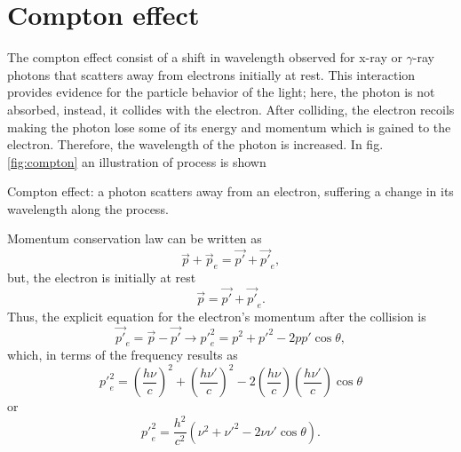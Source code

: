 \documentclass{article}
\begin{document}
\section{Compton effect}
The compton effect consist of a shift in wavelength observed for x-ray or $\gamma$-ray photons that scatters away from electrons initially at rest. This interaction provides evidence for the particle behavior of the light; here, the photon is not absorbed, instead, it collides with the electron. After colliding, the electron recoils making the photon lose some of its energy and momentum which is gained to the electron. Therefore, the wavelength of the photon is increased. In fig. \ref{fig:compton} an illustration of process is shown
\begin{marginfigure}%
  \caption{Compton effect: a photon scatters away from an electron, suffering a change in its wavelength along the process.}
  \label{fig:compton}
\end{marginfigure}
Momentum conservation law can be written as
\begin{equation}\label{eq:momentumconserv}
  \vec{p}+\vec{p}_e=\vec{p'}+\vec{p'}_e,
\end{equation}
but, the electron is initially at rest
\begin{equation}\label{eq:momentumconserv1}
  \vec{p}=\vec{p'}+\vec{p'}_e.  
\end{equation}
Thus, the explicit equation for the electron's momentum after the collision is
\begin{equation}\label{eq:momentumconserv2}
  \vec{p'}_e=\vec{p}-\vec{p'}\rightarrow{p'}^2_e=p^2+{p'}^2-2pp'\cos\theta,
\end{equation}
which, in terms of the frequency results as
\begin{equation}\label{eq:momentumconserv3}
  {p'}^2_e=\left(\frac{h\nu}{c}\right)^2+\left(\frac{h\nu'}{c}\right)^2-2\left(\frac{h\nu}{c}\right)\left(\frac{h\nu'}{c}\right)\cos\theta
\end{equation}
or
\begin{equation}\label{eq:momentumconserv4}
  {p'}^2_e=\frac{h^2}{c^2}\left(\nu^2+\nu'^2-2\nu\nu'\cos\theta\right).
\end{equation}
\end{document}
